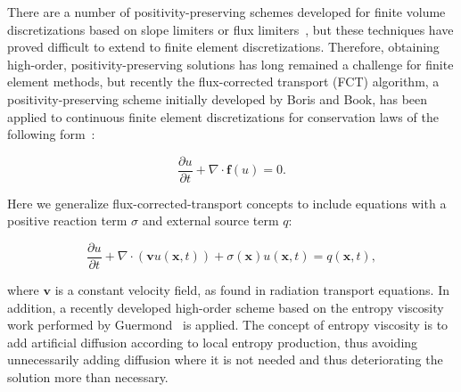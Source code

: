There are a number of positivity-preserving
schemes developed for finite volume discretizations based on slope
limiters or flux limiters~\cite{toro99}\cite{leveque02}, but these
techniques have proved difficult to extend to finite element
discretizations. Therefore, obtaining high-order, positivity-preserving
solutions has long remained a challenge for finite element methods, but
recently the flux-corrected transport (FCT) algorithm,
a positivity-preserving scheme initially developed by Boris and Book\cite{borisbook},
has been applied to continuous finite element discretizations
for conservation laws of the following form~\cite{kuzmin_book}:

\[
   \frac{\partial u}{\partial t} + \nabla\cdot\mathbf{f}(u) = 0.
\]

Here we generalize flux-corrected-transport concepts to
include equations with a positive reaction term $\sigma$ and external
source term $q$:

\begin{equation}\label{eq:tr}
  \frac{\partial u}{\partial t} + \nabla\cdot(\mathbf{v}u(\mathbf{x},t))
  + \sigma(\mathbf{x})u(\mathbf{x},t) = q(\mathbf{x},t),
\end{equation}

where $\mathbf{v}$ is a constant velocity field, as found in
radiation transport equations. In addition, a recently developed
high-order scheme based on the entropy viscosity work performed
by Guermond~\cite{guermond_secondorder} is applied. The
concept of entropy viscosity is to add artificial diffusion
according to local entropy production, thus avoiding unnecessarily
adding diffusion where it is not needed and thus deteriorating 
the solution more than necessary.

